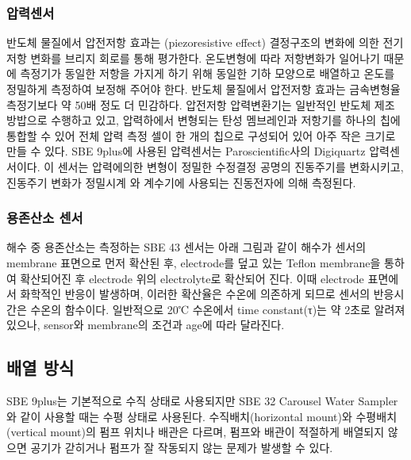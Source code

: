 \documentclass[
]{book}
\begin{document}
\hypertarget{uxc555uxb825uxc13cuxc11c}{%
\subsubsection{압력센서}\label{uxc555uxb825uxc13cuxc11c}}

반도체 물질에서 압전저항 효과는 (piezoresistive effect) 결정구조의 변화에 의한 전기저항 변화를 브리지 회로를 통해 평가한다. 온도변형에 따라 저항변화가 일어나기 때문에 측정기가 동일한 저항을 가지게 하기 위해 동일한 기하 모양으로 배열하고 온도를 정밀하게 측정하여 보정해 주어야 한다. 반도체 물질에서 압전저항 효과는 금속변형율 측정기보다 약 50배 정도 더 민감하다. 압전저항 압력변환기는 일반적인 반도체 제조 방밥으로 수행하고 있고, 압력하에서 변형되는 탄성 멤브레인과 저항기를 하나의 칩에 통합할 수 있어 전체 압력 측정 셀이 한 개의 칩으로 구성되어 있어 아주 작은 크기로 만들 수 있다. SBE 9plus에 사용된 압력센서는 Paroscientific사의 Digiquartz 압력센서이다. 이 센서는 압력에의한 변형이 정밀한 수정결정 공명의 진동주기를 변화시키고, 진동주기 변화가 정밀시계 와 계수기에 사용되는 진동전자에 의해 측정된다.

\hypertarget{uxc6a9uxc874uxc0b0uxc18c-uxc13cuxc11c}{%
\subsubsection{용존산소 센서}\label{uxc6a9uxc874uxc0b0uxc18c-uxc13cuxc11c}}

해수 중 용존산소는 측정하는 SBE 43 센서는 아래 그림과 같이 해수가 센서의 membrane 표면으로 먼저 확산된 후, electrode를 덮고 있는 Teflon membrane을 통하여 확산되어진 후 electrode 위의 electrolyte로 확산되어 진다. 이때 electrode 표면에서 화학적인 반응이 발생하며, 이러한 확산율은 수온에 의존하게 되므로 센서의 반응시간은 수온의 함수이다. 일반적으로 20℃ 수온에서 time constant(τ)는 약 2초로 알려져 있으나, sensor와 membrane의 조건과 age에 따라 달라진다.

\hypertarget{uxbc30uxc5f4-uxbc29uxc2dd}{%
\subsection{배열 방식}\label{uxbc30uxc5f4-uxbc29uxc2dd}}

SBE 9plus는 기본적으로 수직 상태로 사용되지만 SBE 32 Carousel Water Sampler와 같이 사용할 때는 수평 상태로 사용된다. 수직배치(horizontal mount)와 수평배치(vertical mount)의 펌프 위치나 배관은 다르며, 펌프와 배관이 적절하게 배열되지 않으면 공기가 갇히거나 펌프가 잘 작동되지 않는 문제가 발생할 수 있다.
\end{document}
